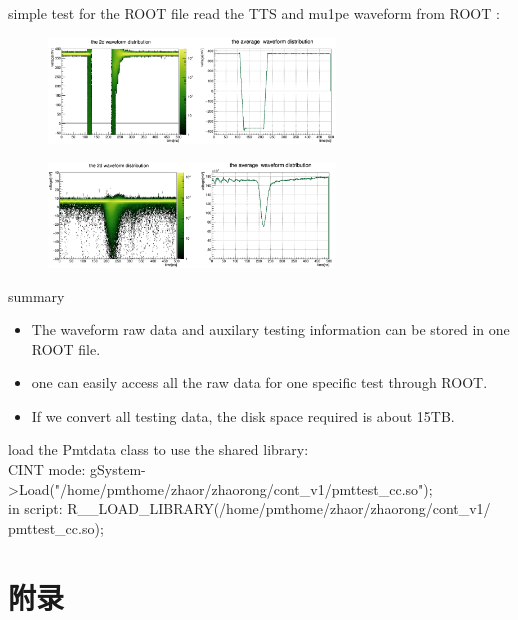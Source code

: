 \documentclass[11pt,compress,xcolor=x11names,UTF8]{beamer}
\begin{document}
\begin{frame}{simple test for the ROOT file}
read the TTS and mu1pe waveform from ROOT :
\begin{figure}
\centering
\includegraphics[width=0.68\textwidth]{ttswave} %
\end{figure}
\begin{figure}
\centering
\includegraphics[width=0.68\textwidth]{mu1pe} %
\end{figure}
\end{frame}

\begin{frame}{summary}
	\begin{itemize}
		\item The waveform raw data and auxilary testing information can be stored in one ROOT file.
		\item one can easily access all the raw data for one specific test through ROOT.
		\item If we convert all testing data, the disk space required is about 15TB.
	\end{itemize}
\end{frame}


\begin{frame}

\end{frame}
\begin{frame}{load the Pmtdata class}
	to use the shared library:\\
CINT mode: gSystem->Load("/home/pmthome/zhaor/zhaorong/cont\_v1/pmttest\_cc.so");\\
in script: R\_\_LOAD\_LIBRARY(/home/pmthome/zhaor/zhaorong/cont\_v1/\\
	pmttest\_cc.so);
\end{frame}


%
%

\appendix

\section*{附录}
\end{document}
